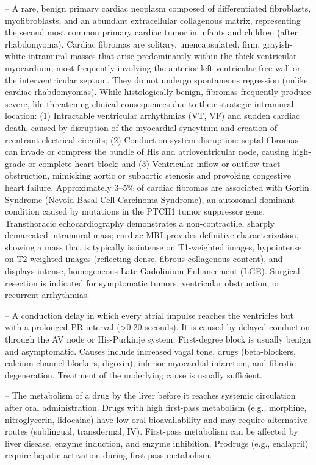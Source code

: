 -- A rare, benign primary cardiac neoplasm composed of differentiated fibroblasts, myofibroblasts, and an abundant extracellular collagenous matrix, representing the second most common primary cardiac tumor in infants and children (after rhabdomyoma). Cardiac fibromas are solitary, unencapsulated, firm, grayish-white intramural masses that arise predominantly within the thick ventricular myocardium, most frequently involving the anterior left ventricular free wall or the interventricular septum. They do not undergo spontaneous regression (unlike cardiac rhabdomyomas). While histologically benign, fibromas frequently produce severe, life-threatening clinical consequences due to their strategic intramural location: (1) Intractable ventricular arrhythmias (VT, VF) and sudden cardiac death, caused by disruption of the myocardial syncytium and creation of reentrant electrical circuits; (2) Conduction system disruption: septal fibromas can invade or compress the bundle of His and atrioventricular node, causing high-grade or complete heart block; and (3) Ventricular inflow or outflow tract obstruction, mimicking aortic or subaortic stenosis and provoking congestive heart failure. Approximately 3--5\% of cardiac fibromas are associated with Gorlin Syndrome (Nevoid Basal Cell Carcinoma Syndrome), an autosomal dominant condition caused by mutations in the PTCH1 tumor suppressor gene. Transthoracic echocardiography demonstrates a non-contractile, sharply demarcated intramural mass; cardiac MRI provides definitive characterization, showing a mass that is typically isointense on T1-weighted images, hypointense on T2-weighted images (reflecting dense, fibrous collagenous content), and displays intense, homogeneous Late Gadolinium Enhancement (LGE). Surgical resection is indicated for symptomatic tumors, ventricular obstruction, or recurrent arrhythmias.

-- A conduction delay in which every atrial impulse reaches the ventricles but with a prolonged PR interval (>0.20 seconds). It is caused by delayed conduction through the AV node or His-Purkinje system. First-degree block is usually benign and asymptomatic. Causes include increased vagal tone, drugs (beta-blockers, calcium channel blockers, digoxin), inferior myocardial infarction, and fibrotic degeneration. Treatment of the underlying cause is usually sufficient.

-- The metabolism of a drug by the liver before it reaches systemic circulation after oral administration. Drugs with high first-pass metabolism (e.g., morphine, nitroglycerin, lidocaine) have low oral bioavailability and may require alternative routes (sublingual, transdermal, IV). First-pass metabolism can be affected by liver disease, enzyme induction, and enzyme inhibition. Prodrugs (e.g., enalapril) require hepatic activation during first-pass metabolism.

